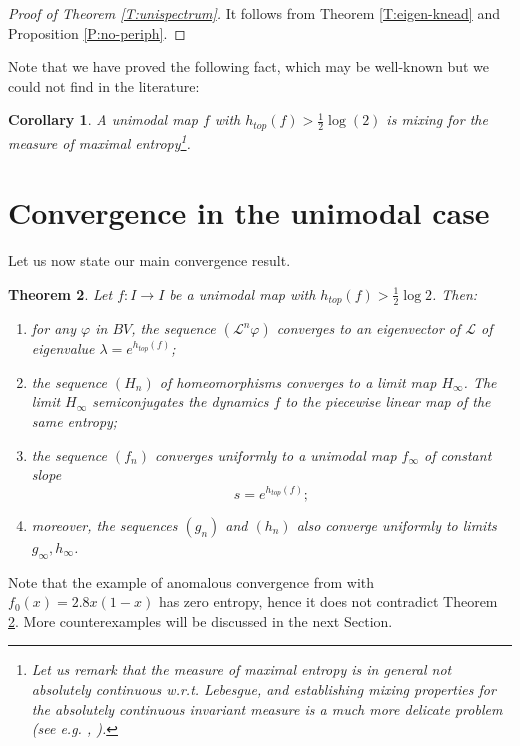 \documentclass[11pt]{amsart}
\newtheorem{theorem}{Theorem}[section]
\newtheorem{corollary}[theorem]{Corollary}
\begin{document}
\begin{proof}[Proof of Theorem \ref{T:unispectrum}]
It follows from Theorem \ref{T:eigen-knead} and Proposition \ref{P:no-periph}. 
\end{proof}

Note that we have proved the following fact, which may be well-known but we could not find in the literature:

\begin{corollary} \label{C:mixing}
A unimodal map $f$ with $h_{top}(f) > \frac{1}{2} \log(2)$ is mixing for the measure of maximal entropy\footnote{Let us remark that the measure of maximal entropy is in general \emph{not} absolutely continuous w.r.t. Lebesgue, 
and establishing mixing properties for the absolutely continuous invariant measure is a much more delicate problem (see e.g. \cite{Blokh-Lyubich}, \cite{Avila-Moreira}).}.
\end{corollary}

\section{Convergence in the unimodal case}

Let us now state our main convergence result. 

\begin{theorem} \label{T:unimodal-conv}
Let $f : I \to I$ be a unimodal map with $h_{top}(f) > \frac{1}{2} \log 2$.
Then:
\begin{enumerate}
\item for any $\varphi$ in $BV$, the sequence $(\mathcal{L}^n \varphi)$ converges to an eigenvector of $\mathcal{L}$
of eigenvalue $\lambda = e^{h_{top}(f)}$;
\item
the sequence $(H_n)$ of homeomorphisms converges to a limit map $H_\infty$.
The limit $H_\infty$ semiconjugates the dynamics $f$ to the piecewise linear map of the same entropy;
\item
the sequence $(f_n)$ converges uniformly to a unimodal map $f_\infty$
of constant slope 
$$s = e^{h_{top}(f)};$$ 
\item moreover, the sequences $(g_n)$ and $(h_n)$ also converge uniformly 
to limits $g_\infty, h_\infty$.
\end{enumerate}
\end{theorem}

Note that the example of anomalous convergence from \cite[Slide 21]{Mil-slides} 
with $f_0(x) = 2.8 x (1-x)$ has zero entropy, hence it does not contradict Theorem \ref{T:unimodal-conv}. 
More counterexamples will be discussed in the next Section.
\end{document}

